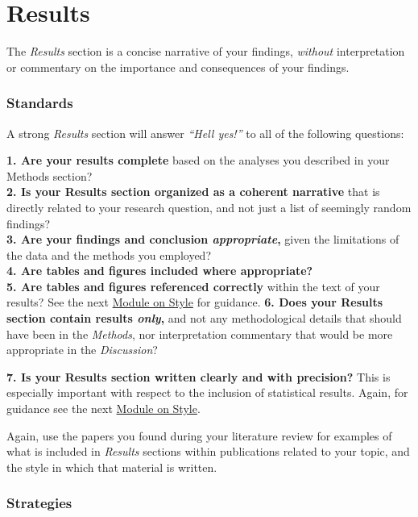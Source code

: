 \documentclass[]{book}
\begin{document}
\hypertarget{results}{%
\section*{Results}\label{results}}

The \emph{Results} section is a concise narrative of your findings, \emph{without} interpretation or commentary on the importance and consequences of your findings.

\hypertarget{standards-3}{%
\subsubsection*{Standards}\label{standards-3}}

A strong \emph{Results} section will answer \emph{``Hell yes!''} to all of the following questions:

\textbf{1. Are your results complete} based on the analyses you described in your Methods section?\\
\textbf{2. Is your Results section organized as a coherent narrative} that is directly related to your research question, and not just a list of seemingly random findings?\\
\textbf{3. Are your findings and conclusion \emph{appropriate},} given the limitations of the data and the methods you employed?\\
\textbf{4. Are tables and figures included where appropriate?}\\
\textbf{5. Are tables and figures referenced correctly} within the text of your results? See the next \protect\hyperlink{style}{Module on Style} for guidance.
\textbf{6. Does your Results section contain results \emph{only},} and not any methodological details that should have been in the \emph{Methods}, nor interpretation commentary that would be more appropriate in the \emph{Discussion}?

\textbf{7. Is your Results section written clearly and with precision?} This is especially important with respect to the inclusion of statistical results. Again, for guidance see the next \protect\hyperlink{style}{Module on Style}.

Again, use the papers you found during your literature review for examples of what is included in \emph{Results} sections within publications related to your topic, and the style in which that material is written.

\hypertarget{strategies-3}{%
\subsubsection*{Strategies}\label{strategies-3}}
\end{document}

